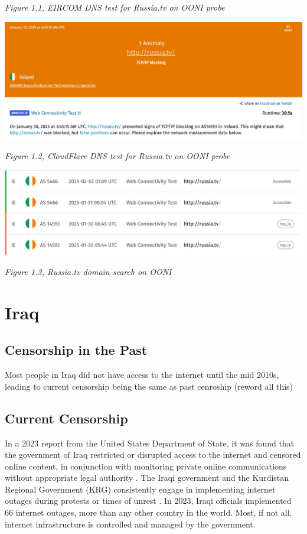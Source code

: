 \centerline{\textit{Figure 1.1, EIRCOM DNS test for Russia.tv on OONI probe}}

\centerline{\includegraphics[width=480pt]{Griff/Latex/TCD SCSS CAPSTONE/Literature Review/CloudFlare Block Russiatv.jpg}}

\centerline{\textit{Figure 1.2, CloudFlare DNS test for Russia.tv on OONI probe}}

\centerline{\includegraphics[width=480pt]{Griff/Latex/TCD SCSS CAPSTONE/Literature Review/RussiaTV search OONI.jpg}}

\centerline{\textit{Figure 1.3, Russia.tv domain search on OONI}}

\section{Iraq}

\subsection{Censorship in the Past}

Most people in Iraq did not have access to the internet until the mid 2010s, leading to current censorship being the same as past cenroship (reword all this)

\subsection{Current Censorship}

In a 2023 report from the United States Department of State, it was found that the government of Iraq restricted or disrupted access to the internet and censored online content, in conjunction with monitoring private online communications without appropriate legal authority \cite{USDoSIraq2023}. The Iraqi government and the Kurdistan Regional Government (KRG) consistently engage in implementing internet outages during protests or times of unrest \cite{freedomhouseIraqFreedom}. In 2023, Iraqi officials implemented 66 internet outages, more than any other country in the world. Most, if not all, internet infrastructure is controlled and managed by the government. 

